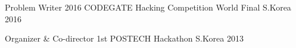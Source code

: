 

\begin{cvhonors}

  \cvhonor
    {Problem Writer} %
    {2016 CODEGATE Hacking Competition World Final} %
    {S.Korea} %
    {2016} %

  \cvhonor
    {Organizer \& Co-director} %
    {1st POSTECH Hackathon} %
    {S.Korea} %
    {2013} %

\end{cvhonors}
